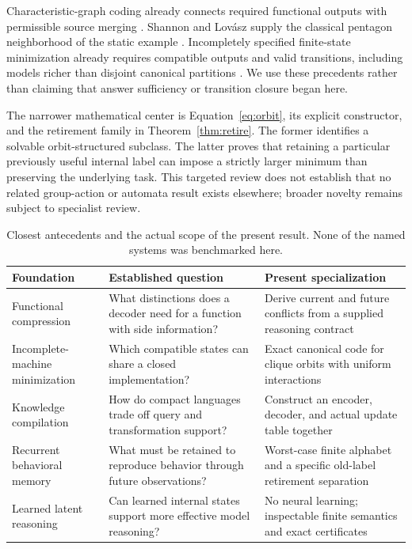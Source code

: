 \documentclass[11pt,letterpaper]{article}
\theoremstyle{remark}\newtheorem{remark}{Remark}[section]
\begin{document}
Characteristic-graph coding already connects required functional outputs with permissible source merging \citep{orlitsky,doshi}. Shannon and Lovász supply the classical pentagon neighborhood of the static example \citep{shannon,lovasz}. Incompletely specified finite-state minimization already requires compatible outputs and valid transitions, including models richer than disjoint canonical partitions \citep{kam,pena}. We use these precedents rather than claiming that answer sufficiency or transition closure began here.

The narrower mathematical center is Equation~\eqref{eq:orbit}, its explicit constructor, and the retirement family in Theorem~\ref{thm:retire}. The former identifies a solvable orbit-structured subclass. The latter proves that retaining a particular previously useful internal label can impose a strictly larger minimum than preserving the underlying task. This targeted review does not establish that no related group-action or automata result exists elsewhere; broader novelty remains subject to specialist review.

\begin{table}[htbp]\centering\small
\caption{Closest antecedents and the actual scope of the present result. None of the named systems was benchmarked here.}\label{tab:prior}
\begin{tabularx}{\linewidth}{@{}P{.24\linewidth}YY@{}}\toprule
Foundation & Established question & Present specialization\\\midrule
Functional compression & What distinctions does a decoder need for a function with side information? & Derive current and future conflicts from a supplied reasoning contract\\
Incomplete-machine minimization & Which compatible states can share a closed implementation? & Exact canonical code for clique orbits with uniform interactions\\
Knowledge compilation & How do compact languages trade off query and transformation support? & Construct an encoder, decoder, and actual update table together\\
Recurrent behavioral memory & What must be retained to reproduce behavior through future observations? & Worst-case finite alphabet and a specific old-label retirement separation\\
Learned latent reasoning & Can learned internal states support more effective model reasoning? & No neural learning; inspectable finite semantics and exact certificates\\\bottomrule
\end{tabularx}
\end{table}
\end{document}
